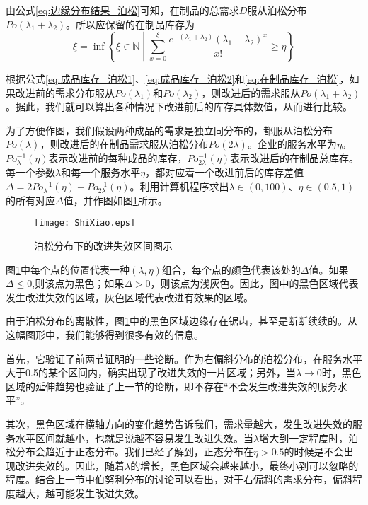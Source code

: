 由公式\ref{eq:边缘分布结果_泊松}可知，在制品的总需求$D$服从泊松分布$Po(\lambda_1+\lambda_2)$。所以应保留的在制品库存为
\begin{equation}
\xi = \inf\left\{\xi\in\mathbb{N}\middle|\sum_{x=0}^{\xi}\frac{e^{-(\lambda_1+\lambda_2)}(\lambda_1+\lambda_2)^x}{x!}\geq \eta\right\}
\label{eq:在制品库存_泊松}
\end{equation}

根据公式\ref{eq:成品库存_泊松1}、\ref{eq:成品库存_泊松2}和\ref{eq:在制品库存_泊松}，如果改进前的需求分布服从$Po(\lambda_1)$和$Po(\lambda_2)$，则改进后的需求服从$Po(\lambda_1+\lambda_2)$。据此，我们就可以算出各种情况下改进前后的库存具体数值，从而进行比较。

为了方便作图，我们假设两种成品的需求是独立同分布的，都服从泊松分布$Po(\lambda)$，则改进后的在制品需求服从泊松分布$Po(2\lambda)$。企业的服务水平为$\eta$。$Po^{-1}_{\lambda}(\eta)$表示改进前的每种成品的库存，$Po^{-1}_{2\lambda}(\eta)$表示改进后的在制品总库存。每一个参数$\lambda$和每一个服务水平$\eta$，都对应着一个改进前后的库存差值$\Delta=2Po^{-1}_{\lambda}(\eta)-Po^{-1}_{2\lambda}(\eta)$。利用计算机程序求出$\lambda\in(0,100)$、$\eta\in(0.5,1)$的所有对应$\Delta$值，并作图如图\ref{fig:泊松分布下的改进失效区间图示}所示。

\begin{figure}[htb]
\centering
\texttt{[image: ShiXiao.eps]}
\caption{泊松分布下的改进失效区间图示}
\label{fig:泊松分布下的改进失效区间图示}
\end{figure}

图\ref{fig:泊松分布下的改进失效区间图示}中每个点的位置代表一种$(\lambda,\eta)$组合，每个点的颜色代表该处的$\Delta$值。如果$\Delta\leq0$,则该点为黑色；如果$\Delta>0$，则该点为浅灰色。因此，图中的黑色区域代表发生改进失效的区域，灰色区域代表改进有效果的区域。

由于泊松分布的离散性，图\ref{fig:泊松分布下的改进失效区间图示}中的黑色区域边缘存在锯齿，甚至是断断续续的。从这幅图形中，我们能够得到很多有效的信息。

首先，它验证了前两节证明的一些论断。作为右偏斜分布的泊松分布，在服务水平大于0.5的某个区间内，确实出现了改进失效的一片区域；另外，当$\lambda\to0$时，黑色区域的延伸趋势也验证了上一节的论断，即不存在“不会发生改进失效的服务水平”。

其次，黑色区域在横轴方向的变化趋势告诉我们，需求量越大，发生改进失效的服务水平区间就越小，也就是说越不容易发生改进失效。当$\lambda$增大到一定程度时，泊松分布会趋近于正态分布。我们已经了解到，正态分布在$\eta>0.5$的时候是不会出现改进失效的。因此，随着$\lambda$的增长，黑色区域会越来越小，最终小到可以忽略的程度。结合上一节中伯努利分布的讨论可以看出，对于右偏斜的需求分布，偏斜程度越大，越可能发生改进失效。

